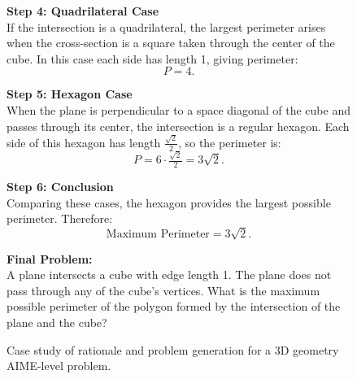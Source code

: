 \begin{figure}[htb]
{\begin{minipage}{0.99\textwidth}
            \vspace{0.5em}
            \noindent\textbf{Step 4: Quadrilateral Case} \\
            If the intersection is a quadrilateral, the largest perimeter arises when the cross-section is a square taken through the center of the cube. In this case each side has length 1, giving perimeter:
            \[
            P = 4.
            \]

            \vspace{0.5em}
            \noindent\textbf{Step 5: Hexagon Case} \\
            When the plane is perpendicular to a space diagonal of the cube and passes through its center, the intersection is a regular hexagon. Each side of this hexagon has length $\tfrac{\sqrt{2}}{2}$, so the perimeter is:
            \[
            P = 6 \cdot \tfrac{\sqrt{2}}{2} = 3\sqrt{2}.
            \]

            \vspace{0.5em}
            \noindent\textbf{Step 6: Conclusion} \\
            Comparing these cases, the hexagon provides the largest possible perimeter. Therefore:
            \[
            \text{Maximum Perimeter} = 3\sqrt{2}.
            \]

            \vspace{1em}
            \textbf{Final Problem:} \\
            A plane intersects a cube with edge length 1. The plane does not pass through any of the cube's vertices. What is the maximum possible perimeter of the polygon formed by the intersection of the plane and the cube?
        \end{minipage}%
    }
    \caption{Case study of rationale and problem generation for a 3D geometry AIME-level problem.}
    \label{fig:case_study_rationale2}
\end{figure}


